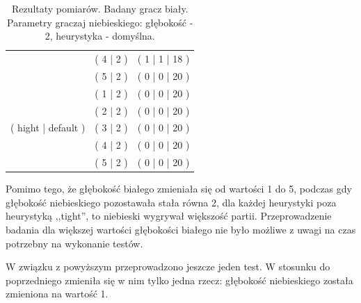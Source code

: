 \begin{table}[htbp!]
\begin{tabular}{ |c|c|c|}
            \cline{2-3}
             & ( 4 | 2 ) & ( 1 | 1 | 18 ) \\
            \cline{2-3}
             & ( 5 | 2 ) & ( 0 | 0 | 20 ) \\
            \hline
            \multirow{5}{*}{( hight | default )} & ( 1 | 2 ) & ( 0 | 0 | 20 ) \\
            \cline{2-3}
             & ( 2 | 2 ) & ( 0 | 0 | 20 ) \\
            \cline{2-3}
             & ( 3 | 2 ) & ( 0 | 0 | 20 ) \\
            \cline{2-3}
             & ( 4 | 2 ) & ( 0 | 0 | 20 ) \\
            \cline{2-3}
             & ( 5 | 2 ) & ( 0 | 0 | 20 ) \\
            \hline
    \end{tabular}
    \caption{Rezultaty pomiarów. Badany gracz biały. Parametry graczaj niebieskiego: głębokość - 2, heurystyka - domyślna.}
\end{table}

Pomimo tego, że głębokość białego zmieniała się od wartości 1 do 5, podczas gdy
głębokość niebieskiego pozostawała stała równa 2, dla każdej heurystyki poza
heurystyką ,,tight'', to niebieski wygrywał większość partii. Przeprowadzenie
badania dla większej wartości głębokości białego nie było możliwe z uwagi na
czas potrzebny na wykonanie testów.

\clearpage

W związku z powyższym przeprowadzono jeszcze jeden test. W stosunku do
poprzedniego zmieniła się w nim tylko jedna rzecz: głębokość niebieskiego
została zmieniona na wartość 1.

